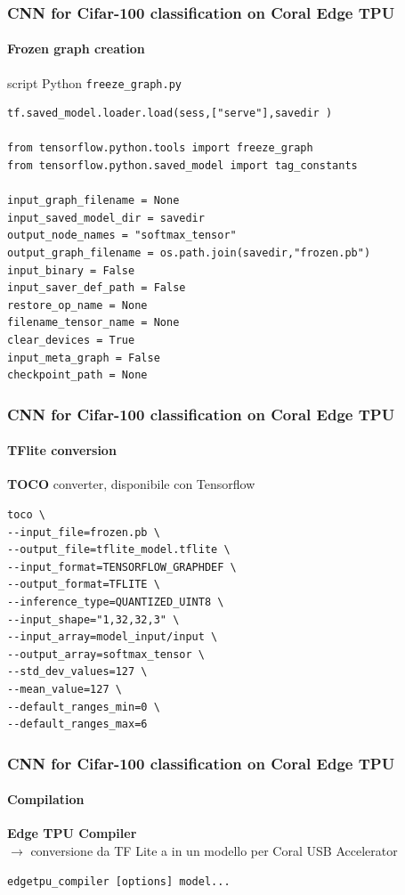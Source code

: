 \documentclass{beamer}
\begin{document}
\begin{frame}[fragile]
\frametitle{CNN for Cifar-100 classification on Coral Edge TPU}
\framesubtitle{Frozen graph creation}
script Python \verb+freeze_graph.py+\\
\begin{lstlisting}
tf.saved_model.loader.load(sess,["serve"],savedir )

from tensorflow.python.tools import freeze_graph
from tensorflow.python.saved_model import tag_constants

input_graph_filename = None
input_saved_model_dir = savedir
output_node_names = "softmax_tensor"
output_graph_filename = os.path.join(savedir,"frozen.pb")
input_binary = False
input_saver_def_path = False
restore_op_name = None
filename_tensor_name = None
clear_devices = True
input_meta_graph = False
checkpoint_path = None
\end{lstlisting}
\end{frame}

\begin{frame}[fragile]
\frametitle{CNN for Cifar-100 classification on Coral Edge TPU}
\framesubtitle{TFlite conversion}
\textbf{TOCO} converter, disponibile con Tensorflow
\begin{lstlisting}
toco \
--input_file=frozen.pb \
--output_file=tflite_model.tflite \
--input_format=TENSORFLOW_GRAPHDEF \
--output_format=TFLITE \
--inference_type=QUANTIZED_UINT8 \
--input_shape="1,32,32,3" \
--input_array=model_input/input \
--output_array=softmax_tensor \
--std_dev_values=127 \
--mean_value=127 \
--default_ranges_min=0 \
--default_ranges_max=6
\end{lstlisting}
\end{frame}


\begin{frame}[fragile]
\frametitle{CNN for Cifar-100 classification on Coral Edge TPU}
\framesubtitle{Compilation}
\textbf{Edge TPU Compiler}\\
\(\rightarrow\) conversione da TF Lite a in un modello per Coral USB Accelerator
\begin{lstlisting}
edgetpu_compiler [options] model...
\end{lstlisting}
\end{frame}
\end{document}
